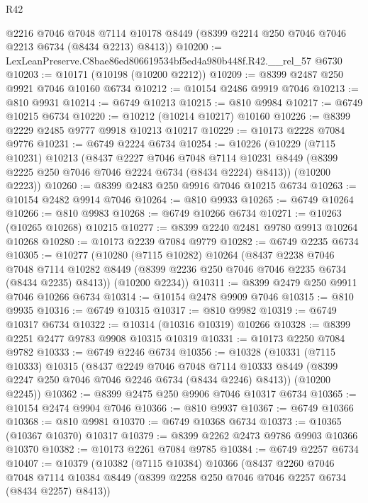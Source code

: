 \begin{lexlean}{R42}
\begin{coremodule}
{      @2216
      @7046
      @7048
      @7114
      @10178
      @8449
      (@8399 @2214 @250 @7046 @7046 @2213 @6734 (@8434 @2213) @8413))
@10200 := LexLeanPreserve.C8bae86ed806619534bf5ed4a980b448f.R42.__rel_57 @6730
@10203 := @10171 (@10198 (@10200 @2212))
@10209 := @8399 @2487 @250 @9921 @7046 @10160 @6734
@10212 := @10154 @2486 @9919 @7046
@10213 := @810 @9931
@10214 := @6749 @10213
@10215 := @810 @9984
@10217 := @6749 @10215 @6734
@10220 := @10212 (@10214 @10217) @10160
@10226 := @8399 @2229 @2485 @9777 @9918 @10213 @10217
@10229 := @10173 @2228 @7084 @9776
@10231 := @6749 @2224 @6734
@10254 := @10226
    (@10229
      (@7115 @10231)
      @10213
      (@8437
        @2227
        @7046
        @7048
        @7114
        @10231
        @8449
        (@8399 @2225 @250 @7046 @7046 @2224 @6734 (@8434 @2224) @8413))
      (@10200 @2223))
@10260 := @8399 @2483 @250 @9916 @7046 @10215 @6734
@10263 := @10154 @2482 @9914 @7046
@10264 := @810 @9933
@10265 := @6749 @10264
@10266 := @810 @9983
@10268 := @6749 @10266 @6734
@10271 := @10263 (@10265 @10268) @10215
@10277 := @8399 @2240 @2481 @9780 @9913 @10264 @10268
@10280 := @10173 @2239 @7084 @9779
@10282 := @6749 @2235 @6734
@10305 := @10277
    (@10280
      (@7115 @10282)
      @10264
      (@8437
        @2238
        @7046
        @7048
        @7114
        @10282
        @8449
        (@8399 @2236 @250 @7046 @7046 @2235 @6734 (@8434 @2235) @8413))
      (@10200 @2234))
@10311 := @8399 @2479 @250 @9911 @7046 @10266 @6734
@10314 := @10154 @2478 @9909 @7046
@10315 := @810 @9935
@10316 := @6749 @10315
@10317 := @810 @9982
@10319 := @6749 @10317 @6734
@10322 := @10314 (@10316 @10319) @10266
@10328 := @8399 @2251 @2477 @9783 @9908 @10315 @10319
@10331 := @10173 @2250 @7084 @9782
@10333 := @6749 @2246 @6734
@10356 := @10328
    (@10331
      (@7115 @10333)
      @10315
      (@8437
        @2249
        @7046
        @7048
        @7114
        @10333
        @8449
        (@8399 @2247 @250 @7046 @7046 @2246 @6734 (@8434 @2246) @8413))
      (@10200 @2245))
@10362 := @8399 @2475 @250 @9906 @7046 @10317 @6734
@10365 := @10154 @2474 @9904 @7046
@10366 := @810 @9937
@10367 := @6749 @10366
@10368 := @810 @9981
@10370 := @6749 @10368 @6734
@10373 := @10365 (@10367 @10370) @10317
@10379 := @8399 @2262 @2473 @9786 @9903 @10366 @10370
@10382 := @10173 @2261 @7084 @9785
@10384 := @6749 @2257 @6734
@10407 := @10379
    (@10382
      (@7115 @10384)
      @10366
      (@8437
        @2260
        @7046
        @7048
        @7114
        @10384
        @8449
        (@8399 @2258 @250 @7046 @7046 @2257 @6734 (@8434 @2257) @8413))
}
\end{coremodule}
\end{lexlean}
